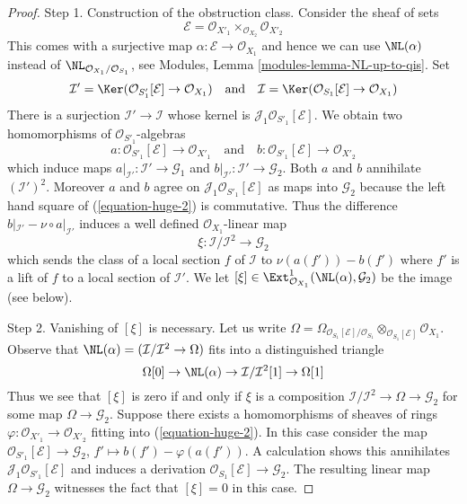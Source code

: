 \begin{proof}
\medskip\noindent
Step 1. Construction of the obstruction class. Consider the sheaf
of sets
$$
\mathcal{E} = \mathcal{O}_{X'_1} \times_{\mathcal{O}_{X_2}} \mathcal{O}_{X'_2}
$$
This comes with a surjective map $\alpha : \mathcal{E} \to \mathcal{O}_{X_1}$
and hence we can use $\NL(\alpha)$ instead of
$\NL_{\mathcal{O}_{X_1}/\mathcal{O}_{S_1}}$, see
Modules, Lemma \ref{modules-lemma-NL-up-to-qis}.
Set
$$
\mathcal{I}' =
\Ker(\mathcal{O}_{S'_1}[\mathcal{E}] \to \mathcal{O}_{X_1})
\quad\text{and}\quad
\mathcal{I} =
\Ker(\mathcal{O}_{S_1}[\mathcal{E}] \to \mathcal{O}_{X_1})
$$
There is a surjection $\mathcal{I}' \to \mathcal{I}$ whose kernel
is $\mathcal{J}_1\mathcal{O}_{S'_1}[\mathcal{E}]$.
We obtain two homomorphisms of $\mathcal{O}_{S'_1}$-algebras
$$
a : \mathcal{O}_{S'_1}[\mathcal{E}] \to \mathcal{O}_{X'_1}
\quad\text{and}\quad
b : \mathcal{O}_{S'_1}[\mathcal{E}] \to \mathcal{O}_{X'_2}
$$
which induce maps $a|_{\mathcal{I}'} : \mathcal{I}' \to \mathcal{G}_1$ and
$b|_{\mathcal{I}'} : \mathcal{I}' \to \mathcal{G}_2$. Both $a$ and $b$
annihilate $(\mathcal{I}')^2$. Moreover $a$ and $b$ agree on
$\mathcal{J}_1\mathcal{O}_{S'_1}[\mathcal{E}]$ as maps into $\mathcal{G}_2$
because the left hand square of (\ref{equation-huge-2}) is commutative.
Thus the difference
$b|_{\mathcal{I}'} - \nu \circ a|_{\mathcal{I}'}$
induces a well defined $\mathcal{O}_{X_1}$-linear map
$$
\xi : \mathcal{I}/\mathcal{I}^2 \longrightarrow \mathcal{G}_2
$$
which sends the class of a local section $f$ of $\mathcal{I}$ to
$\nu(a(f')) - b(f')$ where $f'$ is a lift of $f$ to a local
section of $\mathcal{I}'$. We let
$[\xi] \in \Ext^1_{\mathcal{O}_{X_1}}(\NL(\alpha), \mathcal{G}_2)$
be the image (see below).

\medskip\noindent
Step 2. Vanishing of $[\xi]$ is necessary. Let us write
$\Omega = \Omega_{\mathcal{O}_{S_1}[\mathcal{E}]/\mathcal{O}_{S_1}}
\otimes_{\mathcal{O}_{S_1}[\mathcal{E}]} \mathcal{O}_{X_1}$.
Observe that $\NL(\alpha) = (\mathcal{I}/\mathcal{I}^2 \to \Omega)$
fits into a distinguished triangle
$$
\Omega[0] \to
\NL(\alpha) \to
\mathcal{I}/\mathcal{I}^2[1] \to
\Omega[1]
$$
Thus we see that $[\xi]$ is zero if and only if $\xi$
is a composition $\mathcal{I}/\mathcal{I}^2 \to \Omega \to \mathcal{G}_2$
for some map $\Omega \to \mathcal{G}_2$. Suppose there exists a
homomorphisms of sheaves of rings
$\varphi : \mathcal{O}_{X'_1} \to \mathcal{O}_{X'_2}$ fitting into
(\ref{equation-huge-2}). In this case consider the map
$\mathcal{O}_{S'_1}[\mathcal{E}] \to \mathcal{G}_2$,
$f' \mapsto b(f') - \varphi(a(f'))$. A calculation
shows this annihilates $\mathcal{J}_1\mathcal{O}_{S'_1}[\mathcal{E}]$
and induces a derivation $\mathcal{O}_{S_1}[\mathcal{E}] \to \mathcal{G}_2$.
The resulting linear map $\Omega \to \mathcal{G}_2$ witnesses the
fact that $[\xi] = 0$ in this case.


\end{proof}
